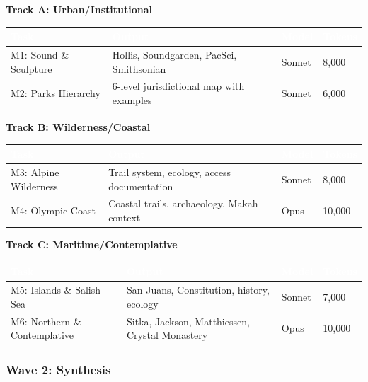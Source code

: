 \documentclass[11pt,letterpaper]{article}
\newcommand{\tableheader}[1]{\textbf{\sffamily\textcolor{white}{#1}}}
\begin{document}
\textbf{Track A: Urban/Institutional}

\begin{center}
\begin{tabularx}{\textwidth}{L{3cm}XC{1.5cm}C{2cm}}
\toprule
{}
\tableheader{Task} & \tableheader{Output} & \tableheader{Model} & \tableheader{Tokens} \\
\midrule
M1: Sound \& Sculpture & Hollis, Soundgarden, PacSci, Smithsonian & Sonnet & 8,000 \\
M2: Parks Hierarchy & 6-level jurisdictional map with examples & Sonnet & 6,000 \\
\bottomrule
\end{tabularx}
\end{center}

\textbf{Track B: Wilderness/Coastal}

\begin{center}
\begin{tabularx}{\textwidth}{L{3cm}XC{1.5cm}C{2cm}}
\toprule
{}
\tableheader{Task} & \tableheader{Output} & \tableheader{Model} & \tableheader{Tokens} \\
\midrule
M3: Alpine Wilderness & Trail system, ecology, access documentation & Sonnet & 8,000 \\
M4: Olympic Coast & Coastal trails, archaeology, Makah context & Opus & 10,000 \\
\bottomrule
\end{tabularx}
\end{center}

\textbf{Track C: Maritime/Contemplative}

\begin{center}
\begin{tabularx}{\textwidth}{L{3cm}XC{1.5cm}C{2cm}}
\toprule
{}
\tableheader{Task} & \tableheader{Output} & \tableheader{Model} & \tableheader{Tokens} \\
\midrule
M5: Islands \& Salish Sea & San Juans, Constitution, history, ecology & Sonnet & 7,000 \\
M6: Northern \& Contemplative & Sitka, Jackson, Matthiessen, Crystal Monastery & Opus & 10,000 \\
\bottomrule
\end{tabularx}
\end{center}

\subsubsection{Wave 2: Synthesis}
\end{document}
